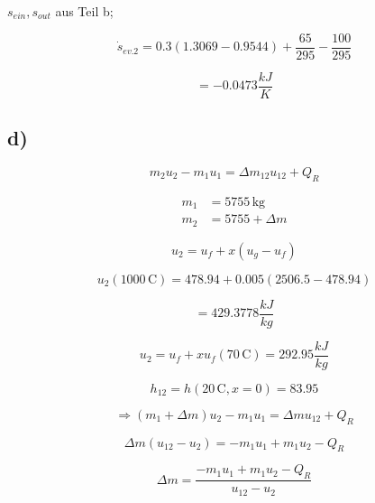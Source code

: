 $s_{ein}, s_{out}$ aus Teil b;

\begin{equation*}
\dot{s}_{ev.2} = 0.3 (1.3069 - 0.9544) + \frac{65}{295} - \frac{100}{295}
\end{equation*}

\begin{equation*}
= -0.0473 \frac{kJ}{K}
\end{equation*}

\subsection*{d)}

\begin{equation*}
m_2 u_2 - m_1 u_1 = \Delta m_{12} u_{12} + Q_R
\end{equation*}

\begin{align*}
m_1 &= 5755 \, \text{kg} \\
m_2 &= 5755 + \Delta m
\end{align*}

\begin{equation*}
u_2 = u_f + x (u_g - u_f)
\end{equation*}

\begin{equation*}
u_2 (1000 \, \text{C}) = 478.94 + 0.005 \left( 2506.5 - 478.94 \right)
\end{equation*}

\begin{equation*}
= 429.3778 \frac{kJ}{kg}
\end{equation*}

\begin{equation*}
u_2 = u_f + x u_f (70 \, \text{C}) = 292.95 \frac{kJ}{kg}
\end{equation*}

\begin{equation*}
h_{12} = h (20 \, \text{C}, x = 0) = 83.95
\end{equation*}

\begin{equation*}
\Rightarrow (m_1 + \Delta m) u_2 - m_1 u_1 = \Delta m u_{12} + Q_R
\end{equation*}

\begin{equation*}
\Delta m (u_{12} - u_2) = -m_1 u_1 + m_1 u_2 - Q_R
\end{equation*}

\begin{equation*}
\Delta m = \frac{-m_1 u_1 + m_1 u_2 - Q_R}{u_{12} - u_2}
\end{equation*}

